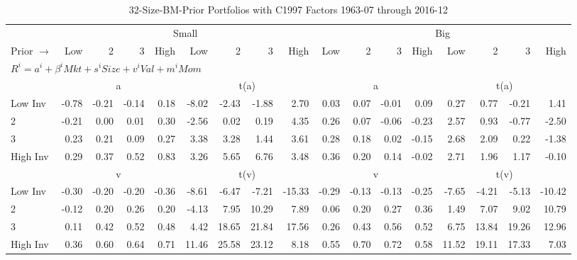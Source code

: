 
\begin{table}[!ht]
\footnotesize
\centering
\caption{32-Size-BM-Prior Portfolios with C1997 Factors 1963-07 through 2016-12}
\begin{tabular}{lrrrrrrrrrrrrrrrr}
  \toprule
    & \multicolumn{8}{c}{Small} & \multicolumn{8}{c}{Big} \\
      \cmidrule(r){2-9} \cmidrule(r){10-17}
    Prior $\rightarrow$ & Low & 2 & 3 & High & Low & 2 & 3 & High & Low & 2 & 3 & High & Low & 2 & 3 & High \\ 
  \midrule
  \multicolumn{17}{l}{$R^i=a^i+\beta^iMkt+s^iSize+v^iVal+m^iMom$} \\

  
    
      & \multicolumn{4}{c}{a} & \multicolumn{4}{c}{t(a)}
    
      & \multicolumn{4}{c}{a} & \multicolumn{4}{c}{t(a)}
    
    \\
      \cmidrule(r){2-5} \cmidrule(r){6-9} \cmidrule(r){10-13} \cmidrule(r){14-17}

    Low Inv   & -0.78  & -0.21  & -0.14  & 0.18  & -8.02  & -2.43  & -1.88  & 2.70  & 0.03  & 0.07  & -0.01  & 0.09  & 0.27  & 0.77  & -0.21  & 1.41  \\
           2  & -0.21  & 0.00  & 0.01  & 0.30  & -2.56  & 0.02  & 0.19  & 4.35  & 0.26  & 0.07  & -0.06  & -0.23  & 2.57  & 0.93  & -0.77  & -2.50  \\
           3  & 0.23  & 0.21  & 0.09  & 0.27  & 3.38  & 3.28  & 1.44  & 3.61  & 0.28  & 0.18  & 0.02  & -0.15  & 2.68  & 2.09  & 0.22  & -1.38  \\
    High Inv  & 0.29  & 0.37  & 0.52  & 0.83  & 3.26  & 5.65  & 6.76  & 3.48  & 0.36  & 0.20  & 0.14  & -0.02  & 2.71  & 1.96  & 1.17  & -0.10  \\

  
    
      & \multicolumn{4}{c}{v} & \multicolumn{4}{c}{t(v)}
    
      & \multicolumn{4}{c}{v} & \multicolumn{4}{c}{t(v)}
    
    \\
      \cmidrule(r){2-5} \cmidrule(r){6-9} \cmidrule(r){10-13} \cmidrule(r){14-17}

    Low Inv   & -0.30  & -0.20  & -0.20  & -0.36  & -8.61  & -6.47  & -7.21  & -15.33  & -0.29  & -0.13  & -0.13  & -0.25  & -7.65  & -4.21  & -5.13  & -10.42  \\
           2  & -0.12  & 0.20  & 0.26  & 0.20  & -4.13  & 7.95  & 10.29  & 7.89  & 0.06  & 0.20  & 0.27  & 0.36  & 1.49  & 7.07  & 9.02  & 10.79  \\
           3  & 0.11  & 0.42  & 0.52  & 0.48  & 4.42  & 18.65  & 21.84  & 17.56  & 0.26  & 0.43  & 0.56  & 0.52  & 6.75  & 13.84  & 19.26  & 12.96  \\
    High Inv  & 0.36  & 0.60  & 0.64  & 0.71  & 11.46  & 25.58  & 23.12  & 8.18  & 0.55  & 0.70  & 0.72  & 0.58  & 11.52  & 19.11  & 17.33  & 7.03  \\


\end{tabular}
\end{table}
